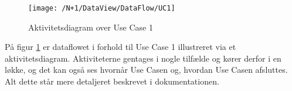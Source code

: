 \begin{figure}[H]
	\centering
	\texttt{[image: /N+1/DataView/DataFlow/UC1]}
	\caption{Aktivitetsdiagram over Use Case 1}	
	\label{AktDia}
\end{figure}

På figur \ref{AktDia} er dataflowet i forhold til Use Case 1 illustreret via et aktivitetsdiagram. Aktiviteterne gentages i nogle tilfælde og kører derfor i en løkke, og det kan også ses hvornår Use Casen og, hvordan Use Casen afsluttes. Alt dette står mere detaljeret beskrevet i dokumentationen. 